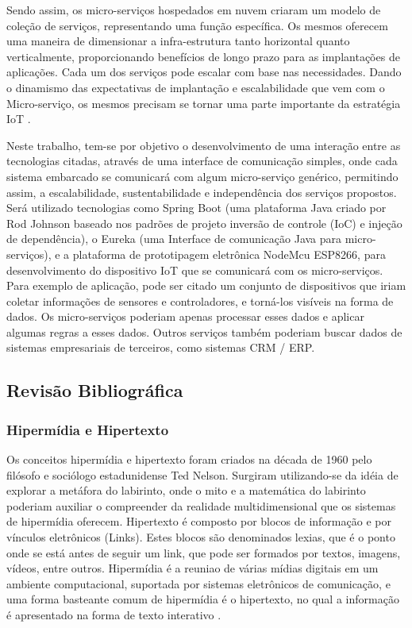 \documentclass[journal]{IEEEtran}
\begin{document}
Sendo assim, os micro-serviços hospedados em nuvem criaram um modelo de coleção de serviços, representando uma função específica. Os mesmos oferecem uma maneira de dimensionar a infra-estrutura tanto horizontal quanto verticalmente, proporcionando benefícios de longo prazo para as implantações de aplicações. Cada um dos serviços pode escalar com base nas necessidades. Dando o dinamismo das expectativas de implantação e escalabilidade que vem com o Micro-serviço, os mesmos precisam se tornar uma parte importante da estratégia IoT \cite{manutayal2016}.

Neste trabalho, tem-se por objetivo o desenvolvimento de uma interação entre as tecnologias citadas, através de uma interface de comunicação simples, onde cada sistema embarcado se comunicará com algum micro-serviço genérico, permitindo assim, a escalabilidade, sustentabilidade e independência dos serviços propostos. Será utilizado tecnologias como Spring Boot (uma plataforma Java criado por Rod Johnson baseado nos padrões de projeto inversão de controle (IoC) e injeção de dependência), o Eureka (uma Interface de comunicação Java para micro-serviços), e a plataforma de prototipagem eletrônica NodeMcu ESP8266, para desenvolvimento do dispositivo IoT que se comunicará com os micro-serviços. Para exemplo de aplicação, pode ser citado  um conjunto de dispositivos que iriam coletar informações de sensores e controladores, e torná-los visíveis na forma de dados. Os micro-serviços poderiam apenas processar esses dados e aplicar algumas regras a esses dados. Outros serviços também poderiam buscar dados de sistemas empresariais de terceiros, como sistemas CRM / ERP.


\subsection{Revisão Bibliográfica}
\subsubsection{Hipermídia e Hipertexto}
Os conceitos hipermídia e hipertexto foram criados na década de 1960 pelo filósofo e sociólogo estadunidense Ted Nelson. Surgiram utilizando-se da idéia de explorar a metáfora do labirinto, onde o mito e a matemática do labirinto poderiam auxiliar o compreender da realidade multidimensional que os sistemas de hipermídia oferecem. Hipertexto é composto por blocos de informação e por vínculos eletrônicos (Links). Estes blocos são denominados lexias, que é o ponto onde se está antes de seguir um link, que pode ser formados por textos, imagens, vídeos, entre outros. Hipermídia é a reuniao de várias mídias digitais em um ambiente computacional, suportada por sistemas eletrônicos de comunicação, e uma forma basteante comum de hipermídia é o hipertexto, no qual a informação é apresentado na forma de texto interativo \cite{lillianhiper}.
\end{document}
